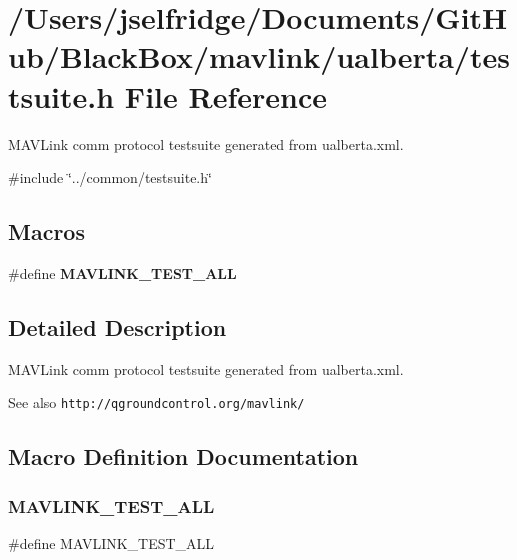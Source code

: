 \section{/\+Users/jselfridge/\+Documents/\+Git\+Hub/\+Black\+Box/mavlink/ualberta/testsuite.h File Reference}
\label{ualberta_2testsuite_8h}


M\+A\+V\+Link comm protocol testsuite generated from ualberta.\+xml.  


{\ttfamily \#include \char`\"{}../common/testsuite.\+h\char`\"{}}\newline
\subsection*{Macros}
\begin{DoxyCompactItemize}
\item 
\#define \textbf{ M\+A\+V\+L\+I\+N\+K\+\_\+\+T\+E\+S\+T\+\_\+\+A\+LL}
\end{DoxyCompactItemize}


\subsection{Detailed Description}
M\+A\+V\+Link comm protocol testsuite generated from ualberta.\+xml. 

\begin{DoxySeeAlso}{See also}
{\tt http\+://qgroundcontrol.\+org/mavlink/} 
\end{DoxySeeAlso}


\subsection{Macro Definition Documentation}
\mbox{\label{ualberta_2testsuite_8h_ae706a993ca59ccc1a8a7c330f0b1ceec}} 
\subsubsection{M\+A\+V\+L\+I\+N\+K\+\_\+\+T\+E\+S\+T\+\_\+\+A\+LL}
{\footnotesize\ttfamily \#define M\+A\+V\+L\+I\+N\+K\+\_\+\+T\+E\+S\+T\+\_\+\+A\+LL}

